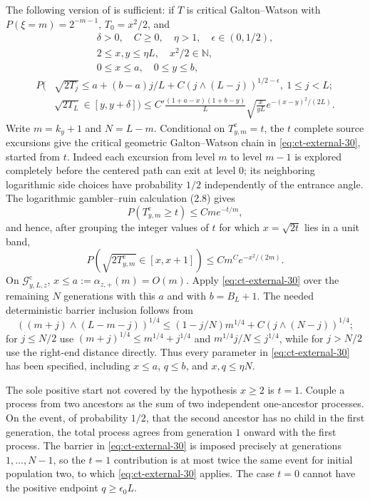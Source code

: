 \documentclass[12pt,reqno]{amsart}
\theoremstyle{plain}
\theoremstyle{definition}
\theoremstyle{remark}
\numberwithin{equation}{section}
\begin{document}
The following version of \cite[Appendix, Theorem~9.1(a)]{Rosen2022}
is sufficient: if $T$ is critical Galton--Watson with
$P(\xi=m)=2^{-m-1}$, $T_0=x^2/2$, and
\[
\begin{gathered}
\delta>0,\quad C\ge0,\quad\eta>1,\quad\epsilon\in(0,1/2),\\
2\le x,y\le\eta L,\quad x^2/2\in\mathbb N,\\
0\le x\le a,\quad0\le y\le b,
\end{gathered}
\]
\begin{equation}
\begin{split}
P\big(&\sqrt{2T_j}\le a+(b-a)j/L
             +C(j\wedge(L-j))^{1/2-\epsilon},\ 1\le j<L;\\
&\sqrt{2T_L}\in[y,y+\delta]\big)
\le C'\frac{(1+a-x)(1+b-y)}L\sqrt{\frac{x}{yL}}
e^{-(x-y)^2/(2L)}.\label{eq:ct-external-30}
\end{split}
\end{equation}
Write $m=k_y+1$ and $N=L-m$.  Conditional on $T^{\mathrm c}_{y,m}=t$,
the $t$ complete source excursions give the critical geometric
Galton--Watson chain in \eqref{eq:ct-external-30}, started from $t$.
Indeed each excursion from level $m$ to level $m-1$ is explored completely
before the centered path can exit at level $0$; its neighboring logarithmic
side choices have probability $1/2$ independently of the entrance angle.
The logarithmic
gambler--ruin calculation (2.8) gives
\[
P(T^{\mathrm c}_{y,m}\ge t)\le Cm e^{-t/m},
\]
and hence, after grouping the integer values of $t$ for which
$x=\sqrt{2t}$ lies in a unit band,
\begin{equation}
P(\sqrt{2T^{\mathrm c}_{y,m}}\in[x,x+1])
       \le Cm^C e^{-x^2/(2m)}.\label{eq:ct-external-30a}
\end{equation}
On $\mathcal{G}^{\mathrm c}_{y,L,z}$, $x\le a:=\alpha_{z,+}(m)=O(m)$.
Apply \eqref{eq:ct-external-30} over the remaining $N$ generations with this $a$ and
with $b=B_L+1$.  The needed deterministic barrier inclusion follows
from
\begin{equation}
((m+j)\wedge(L-m-j))^{1/4}
 \le (1-j/N)m^{1/4}+C(j\wedge(N-j))^{1/4};\label{eq:ct-external-30b}
\end{equation}
for $j\le N/2$ use
$(m+j)^{1/4}\le m^{1/4}+j^{1/4}$ and
$m^{1/4}j/N\le j^{1/4}$, while for $j>N/2$ use the
right-end distance directly.  Thus every parameter in \eqref{eq:ct-external-30} has been
specified, including $x\le a$, $q\le b$, and
$x,q\le\eta N$.

The sole positive start not covered by the hypothesis $x\ge2$ is
$t=1$.  Couple a process from two ancestors as the sum of two
independent one-ancestor processes.  On the event, of probability
$1/2$, that the second ancestor has no child in the first generation,
the total process agrees from generation $1$ onward with the first
process.  The barrier in \eqref{eq:ct-external-30} is imposed precisely at generations
$1,\ldots,N-1$, so the $t=1$ contribution is at most twice the same
event for initial population two, to which \eqref{eq:ct-external-30} applies.  The case
$t=0$ cannot have the positive endpoint $q\ge\epsilon_0L$.
\end{document}
